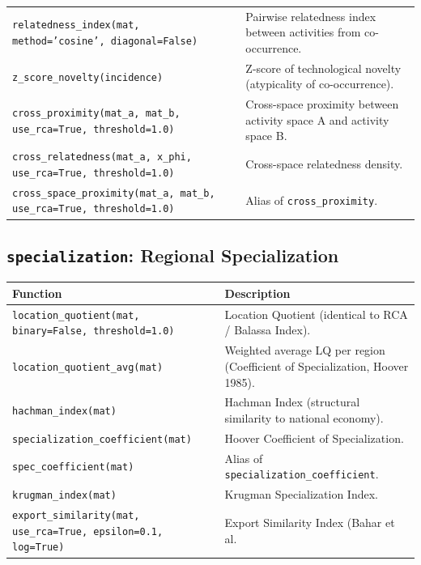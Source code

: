 \begin{longtable}{>{\raggedright\arraybackslash}p{9.2cm} >{\raggedright\arraybackslash}p{7.0cm}}
\texttt{\footnotesize relatedness\_index(mat, method='cosine', diagonal=False)} & {\small Pairwise relatedness index between activities from co-occurrence.} \\[2pt]
\texttt{\footnotesize z\_score\_novelty(incidence)} & {\small Z-score of technological novelty (atypicality of co-occurrence).} \\[2pt]
\texttt{\footnotesize cross\_proximity(mat\_a, mat\_b, use\_rca=True, threshold=1.0)} & {\small Cross-space proximity between activity space A and activity space B.} \\[2pt]
\texttt{\footnotesize cross\_relatedness(mat\_a, x\_phi, use\_rca=True, threshold=1.0)} & {\small Cross-space relatedness density.} \\[2pt]
\texttt{\footnotesize cross\_space\_proximity(mat\_a, mat\_b, use\_rca=True, threshold=1.0)} & {\small Alias of \texttt{cross\_proximity}.} \\[2pt]
\bottomrule
\end{longtable}

\subsection{\texttt{specialization}: Regional Specialization}
\begin{longtable}{>{\raggedright\arraybackslash}p{9.2cm} >{\raggedright\arraybackslash}p{7.0cm}}
\toprule
\textbf{Function} & \textbf{Description} \\
\midrule\endhead
\texttt{\footnotesize location\_quotient(mat, binary=False, threshold=1.0)} & {\small Location Quotient (identical to RCA / Balassa Index).} \\[2pt]
\texttt{\footnotesize location\_quotient\_avg(mat)} & {\small Weighted average LQ per region (Coefficient of Specialization, Hoover 1985).} \\[2pt]
\texttt{\footnotesize hachman\_index(mat)} & {\small Hachman Index (structural similarity to national economy).} \\[2pt]
\texttt{\footnotesize specialization\_coefficient(mat)} & {\small Hoover Coefficient of Specialization.} \\[2pt]
\texttt{\footnotesize spec\_coefficient(mat)} & {\small Alias of \texttt{specialization\_coefficient}.} \\[2pt]
\texttt{\footnotesize krugman\_index(mat)} & {\small Krugman Specialization Index.} \\[2pt]
\texttt{\footnotesize export\_similarity(mat, use\_rca=True, epsilon=0.1, log=True)} & {\small Export Similarity Index (Bahar et al.} \\[2pt]
\bottomrule
\end{longtable}

